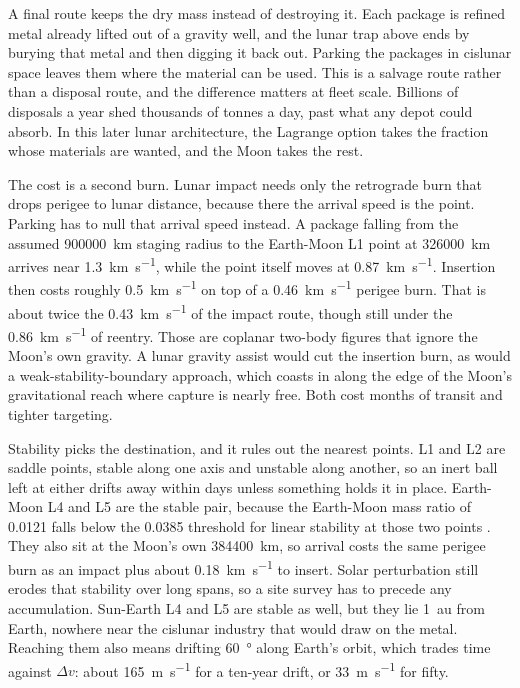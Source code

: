 \documentclass{article}
\newcommand{\deltav}{\Delta v}
\begin{document}
A final route keeps the dry mass instead of destroying it. Each package is refined metal already lifted out of a gravity well, and the lunar trap above ends by burying that metal and then digging it back out. Parking the packages in cislunar space leaves them where the material can be used. This is a salvage route rather than a disposal route, and the difference matters at fleet scale. Billions of disposals a year shed thousands of tonnes a day, past what any depot could absorb. In this later lunar architecture, the Lagrange option takes the fraction whose materials are wanted, and the Moon takes the rest.

The cost is a second burn. Lunar impact needs only the retrograde burn that drops perigee to lunar distance, because there the arrival speed is the point. Parking has to null that arrival speed instead. A package falling from the assumed \SI{900000}{\kilo\meter} staging radius to the Earth-Moon L1 point at \SI{326000}{\kilo\meter} arrives near \SI{1.3}{\kilo\meter\per\second}, while the point itself moves at \SI{0.87}{\kilo\meter\per\second}. Insertion then costs roughly \SI{0.5}{\kilo\meter\per\second} on top of a \SI{0.46}{\kilo\meter\per\second} perigee burn. That is about twice the \SI{0.43}{\kilo\meter\per\second} of the impact route, though still under the \SI{0.86}{\kilo\meter\per\second} of reentry. Those are coplanar two-body figures that ignore the Moon's own gravity. A lunar gravity assist would cut the insertion burn, as would a weak-stability-boundary approach, which coasts in along the edge of the Moon's gravitational reach where capture is nearly free. Both cost months of transit and tighter targeting.

Stability picks the destination, and it rules out the nearest points. L1 and L2 are saddle points, stable along one axis and unstable along another, so an inert ball left at either drifts away within days unless something holds it in place. Earth-Moon L4 and L5 are the stable pair, because the Earth-Moon mass ratio of \num{0.0121} falls below the \num{0.0385} threshold for linear stability at those two points \cite{vallado_astrodynamics}. They also sit at the Moon's own \SI{384400}{\kilo\meter}, so arrival costs the same perigee burn as an impact plus about \SI{0.18}{\kilo\meter\per\second} to insert. Solar perturbation still erodes that stability over long spans, so a site survey has to precede any accumulation. Sun-Earth L4 and L5 are stable as well, but they lie \SI{1}{\astronomicalunit} from Earth, nowhere near the cislunar industry that would draw on the metal. Reaching them also means drifting \SI{60}{\degree} along Earth's orbit, which trades time against $\deltav$: about \SI{165}{\meter\per\second} for a ten-year drift, or \SI{33}{\meter\per\second} for fifty.
\end{document}
